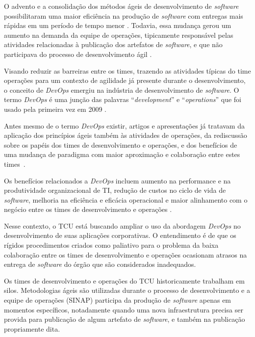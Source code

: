 O advento e a consolidação dos métodos ágeis de desenvolvimento de
\textit{software} possibilitaram uma maior eficiência na produção de
\textit{software} com entregas mais rápidas em um período de tempo menor
\cite{agile_sw_dev}. Todavia, essa mudança gerou um aumento na demanda da equipe de
operações, tipicamente responsável pelas atividades relacionadas à
publicação dos artefatos de \textit{software}, e que não participava
do processo de desenvolvimento ágil \cite{humble2010continuous}.

Visando reduzir as barreiras entre os times, trazendo as atividades típicas
do time operações para um contexto de agilidade já presente durante o
desenvolvimento, o conceito de \textit{DevOps} emergiu na indústria de
desenvolvimento de \textit{software}. O termo \textit{DevOps} é uma
junção das palavras ``\textit{development}'' e ``\textit{operations}'' que
foi usado pela primeira vez em 2009 \cite{devops_for_developers}.

Antes mesmo de o termo \textit{DevOps} existir, artigos e apresentações
já tratavam da aplicação dos princípios ágeis também às atividades de operações,
da rediscussão sobre os papéis dos times de desenvolvimento e operações, e dos
benefícios de uma mudança de paradigma com maior aproximação e colaboração
entre estes times~\cite{agile_infra_operations,devops_for_developers,flickr}.

Os benefícios relacionados a \textit{DevOps} incluem aumento na performance
e na produtividade organizacional de \acrshort{TI}, redução de custos no ciclo de vida
de \textit{software}, melhoria na eficiência e eficácia operacional e maior
alinhamento com o negócio entre os times de desenvolvimento e operações
\cite{characterizing_devops}.

Nesse contexto, o \acrfull{TCU} está buscando ampliar o uso da abordagem
\textit{DevOps} no desenvolvimento de suas aplicações corporativas. O
entendimento é de que os rígidos procedimentos criados como paliativo para o
problema da baixa colaboração entre os times de desenvolvimento e operações
ocasionam atrasos na entrega de \textit{software} do órgão que são considerados
inadequados.

Os times de desenvolvimento e operações do \acrshort{TCU} historicamente
trabalham em silos. Metodologias ágeis são utilizadas durante o processo de
desenvolvimento e a equipe de operações (\acrfull{SINAP}) participa da produção
de \textit{software} apenas em momentos específicos, notadamente quando uma nova
infraestrutura precisa ser provida para publicação de algum artefato de
\textit{software}, e também na publicação propriamente dita.

